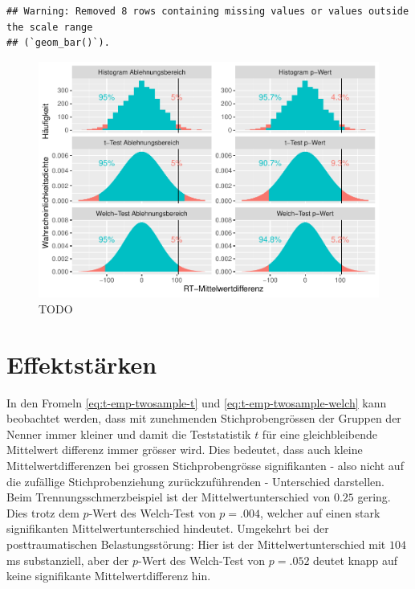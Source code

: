 \documentclass[
]{book}
\theoremstyle{definition}
\theoremstyle{definition}
\theoremstyle{definition}
\theoremstyle{definition}
\theoremstyle{remark}
\begin{document}
\begin{verbatim}
## Warning: Removed 8 rows containing missing values or values outside the scale range
## (`geom_bar()`).
\end{verbatim}

\begin{figure}
\centering
\includegraphics{aps_statistik1_files/figure-latex/exm-emotional-stroop-hist-pval-reja-1.pdf}
\caption{\label{fig:exm-emotional-stroop-hist-pval-reja}TODO}
\end{figure}

\section{Effektstärken}\label{effektstuxe4rken}

In den Fromeln \eqref{eq:t-emp-twosample-t} und \eqref{eq:t-emp-twosample-welch} kann beobachtet werden, dass mit zunehmenden Stichprobengrössen der Gruppen der Nenner immer kleiner und damit die Teststatistik \(t\) für eine gleichbleibende Mittelwert differenz immer grösser wird. Dies bedeutet, dass auch kleine Mittelwertdifferenzen bei grossen Stichprobengrösse signifikanten - also nicht auf die zufällige Stichprobenziehung zurückzuführenden - Unterschied darstellen. Beim Trennungsschmerzbeispiel ist der Mittelwertunterschied von \(0.25\) gering. Dies trotz dem \(p\)-Wert des Welch-Test von \(p=.004\), welcher auf einen stark signifikanten Mittelwertunterschied hindeutet. Umgekehrt bei der posttraumatischen Belastungsstörung: Hier ist der Mittelwertunterschied mit \(104\) ms substanziell, aber der \(p\)-Wert des Welch-Test von \(p=.052\) deutet knapp auf keine signifikante Mittelwertdifferenz hin.
\end{document}
